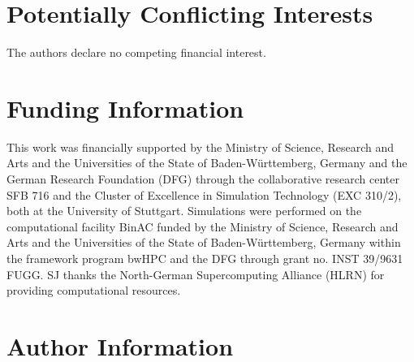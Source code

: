 \documentclass[9pt,lessons,pubversion]{livecoms}
\newcommand{\githubrepository}{\url{https://github.com/DanielMarkthaler/PMF_Artifacts_LessonsLearned_LiveCoMS}}  %
\begin{document}

\section{Potentially Conflicting Interests}

The authors declare no competing financial interest.

\section{Funding Information}
This work was financially supported by the Ministry of Science, Research and Arts and the Universities of the State of Baden-W\"urttemberg, Germany and the German Research Foundation (DFG) 
through the collaborative research center SFB 716 and the Cluster of Excellence in Simulation Technology (EXC 310/2), both at the University of Stuttgart. 
Simulations were performed on the computational facility BinAC funded by the Ministry of Science, Research and Arts and the Universities of the State of Baden-W\"urttemberg, Germany within 
the framework program bwHPC and the DFG through grant no. INST 39/9631 FUGG.
SJ thanks the North-German Supercomputing Alliance (HLRN) for providing computational resources.

\section*{Author Information}
\makeorcid

\nocite{*} %



\appendix
\setcounter{table}{0}
\renewcommand{\thetable}{A\arabic{table}}
\renewcommand\thefigure{A\arabic{figure}}  
\setcounter{figure}{0}
\end{document}
